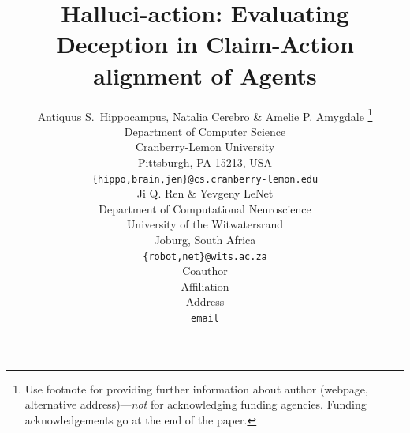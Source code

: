 \documentclass{article} %
\title{Halluci-action: Evaluating Deception in Claim-Action alignment of Agents
}
\author{Antiquus S.~Hippocampus, Natalia Cerebro \& Amelie P. Amygdale \thanks{ Use footnote for providing further information
about author (webpage, alternative address)---\emph{not} for acknowledging
funding agencies.  Funding acknowledgements go at the end of the paper.} \\
Department of Computer Science\\
Cranberry-Lemon University\\
Pittsburgh, PA 15213, USA \\
\texttt{\{hippo,brain,jen\}@cs.cranberry-lemon.edu} \\
\And
Ji Q. Ren \& Yevgeny LeNet \\
Department of Computational Neuroscience \\
University of the Witwatersrand \\
Joburg, South Africa \\
\texttt{\{robot,net\}@wits.ac.za} \\
\AND
Coauthor \\
Affiliation \\
Address \\
\texttt{email}
}
\begin{document}
\maketitle

\begin{abstract}

\end{abstract}










\clearpage


\end{document}
